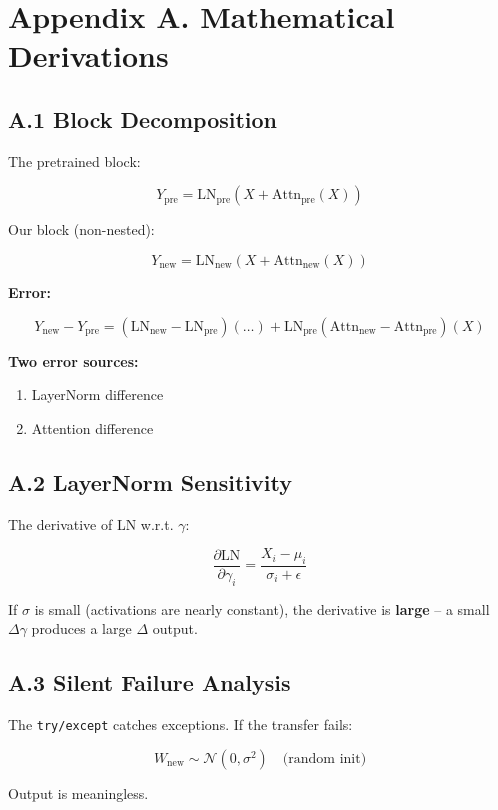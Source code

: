 
\section{Appendix A. Mathematical Derivations}

\subsection{A.1 Block Decomposition}

The pretrained block:

\[
Y_\text{pre} = \text{LN}_\text{pre}(X + \text{Attn}_\text{pre}(X))
\tag{A.1}
\]

Our block (non-nested):

\[
Y_\text{new} = \text{LN}_\text{new}(X + \text{Attn}_\text{new}(X))
\tag{A.2}
\]

\textbf{Error:}

\[
Y_\text{new} - Y_\text{pre} = (\text{LN}_\text{new} - \text{LN}_\text{pre})(\dots) + \text{LN}_\text{pre}(\text{Attn}_\text{new} - \text{Attn}_\text{pre})(X)
\tag{A.3}
\]

\textbf{Two error sources:}
\begin{enumerate}
\item LayerNorm difference
\item Attention difference

\end{enumerate}
\subsection{A.2 LayerNorm Sensitivity}

The derivative of LN w.r.t. $\gamma$:

\[
\frac{\partial \text{LN}}{\partial \gamma_i} = \frac{X_i - \mu_i}{\sigma_i + \epsilon}
\tag{A.4}
\]

If $\sigma$ is small (activations are nearly constant), the derivative is 
\textbf{large} -- a small $\Delta \gamma$ produces a large $\Delta$ output.

\subsection{A.3 Silent Failure Analysis}

The \texttt{try/except} catches exceptions. If the transfer fails:

\[
W_\text{new} \sim \mathcal{N}(0, \sigma^2) \quad \text{(random init)}
\tag{A.5}
\]

Output is meaningless.

